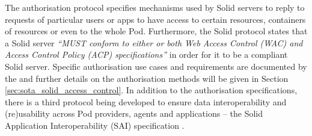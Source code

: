 The authorisation protocol specifies mechanisms used by Solid servers to reply to requests of particular users or apps to have access to certain resources, containers of resources or even to the whole Pod.
Furthermore, the Solid protocol states that a Solid server \textit{``MUST conform to either or both Web Access Control (WAC) and Access Control Policy (ACP) specifications''} in order for it to be a compliant Solid server.
Specific authorisation use cases and requirements are documented by the \cite{solid_editorial_team_use_2023} and further details on the authorisation methods will be given in Section \ref{sec:sota_solid_access_control}.
In addition to the authorisation specifications, there is a third protocol being developed to ensure data interoperability and (re)usability across Pod providers, agents and applications -- the Solid Application Interoperability (SAI) specification \citep{bingham_interop_2023}.

